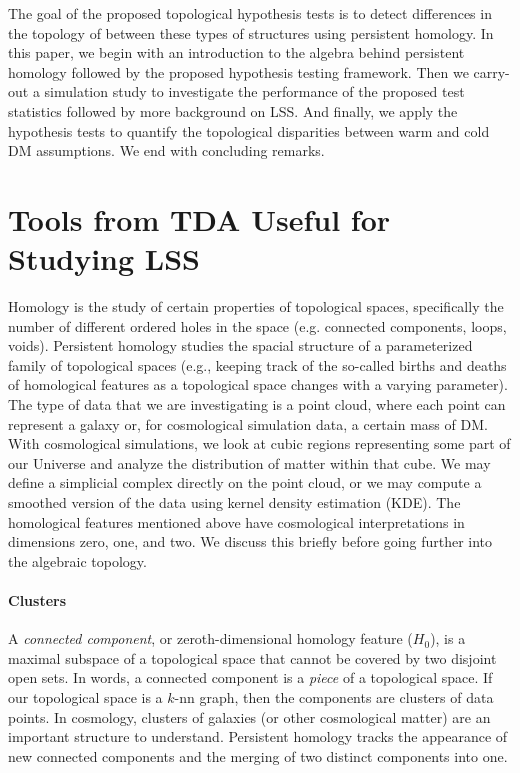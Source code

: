\documentclass[12pt]{article}
\begin{document}
The goal of the proposed topological hypothesis tests is to detect differences in the topology of between these types of structures using persistent homology. In this paper, we begin with an introduction to the algebra behind persistent homology followed by the proposed hypothesis testing framework. Then we carry-out a simulation study to investigate the performance of the proposed test statistics followed by more background on LSS. And finally, we apply the hypothesis tests to quantify the topological disparities between warm and cold DM assumptions. We end with concluding remarks.



\section{Tools from TDA Useful for Studying LSS}
\label{sec:tda}
Homology is the study of certain properties of topological spaces, specifically the number of different ordered holes in the space (e.g. connected components, loops, voids). Persistent homology studies the spacial structure of a parameterized family of topological spaces (e.g., keeping track of the so-called
births and deaths of homological features as a topological space changes with a varying parameter).
%
The type of data that we are investigating is a point cloud, where each point can represent a galaxy or, for cosmological simulation data, a certain mass of DM.
With cosmological simulations,  we look at cubic regions representing some part of our Universe and analyze
the distribution of matter within that cube. We may define a simplicial complex directly on the point cloud, or we may compute a smoothed version of the data using kernel density estimation (KDE). The homological features mentioned above have cosmological interpretations in dimensions zero, one, and two. We discuss this briefly before going further into the algebraic topology.

\paragraph{Clusters}
A \emph{connected component}, or zeroth-dimensional homology feature ($H_0$), is a maximal subspace of a topological
space that cannot be covered by two disjoint open sets. In words, a connected component is a \textit{piece} of a topological space.  If our topological space is a
$k$-nn graph, then the components are clusters of data points.  In cosmology, clusters of galaxies (or other cosmological matter) are an important
structure to understand. Persistent homology tracks the appearance of new connected components and the merging of two distinct components into one.
\end{document}
